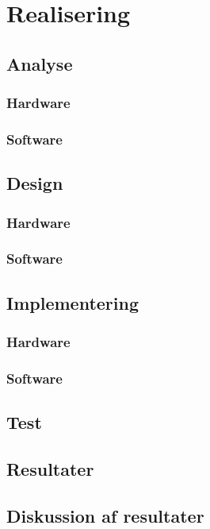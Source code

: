 \documentclass[a4paper, 11pt, oneside]{AuProjectHandin}
\begin{document}

\frontmatter
\tableofcontents
\mainmatter





\chapter{Realisering}

\section{Analyse}
\subsection{Hardware}

\subsection{Software}




\section{Design}
\subsection{Hardware}

\subsection{Software}



\section{Implementering}
\subsection{Hardware}
\subsection{Software}



\section{Test}



\section{Resultater}


\section{Diskussion af resultater}



\backmatter

\end{document}

